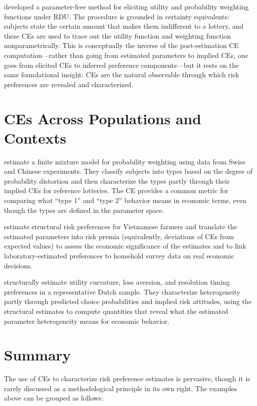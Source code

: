 \documentclass[12pt,a4paper]{article}
\begin{document}
\textcite{Abdellaoui2000} developed a parameter-free method for eliciting
utility and probability weighting functions under RDU. The procedure is
grounded in certainty equivalents: subjects state the certain amount that
makes them indifferent to a lottery, and these CEs are used to trace out the
utility function and weighting function nonparametrically. This is
conceptually the inverse of the post-estimation CE computation---rather than
going from estimated parameters to implied CEs, one goes from elicited CEs to
inferred preference components---but it rests on the same foundational
insight: CEs are the natural observable through which risk preferences are
revealed and characterized.

\section{CEs Across Populations and Contexts}

\textcite{BruhinFehrDudaEpper2010} estimate a finite mixture model for
probability weighting using data from Swiss and Chinese experiments. They
classify subjects into types based on the degree of probability distortion and
then characterize the types partly through their implied CEs for reference
lotteries. The CE provides a common metric for comparing what ``type 1'' and
``type 2'' behavior means in economic terms, even though the types are defined
in the parameter space.

\textcite{Tanaka2010} estimate structural risk preferences for Vietnamese
farmers and translate the estimated parameters into risk premia (equivalently,
deviations of CEs from expected values) to assess the economic significance of
the estimates and to link laboratory-estimated preferences to household survey
data on real economic decisions.

\textcite{vonGaudecker2011} structurally estimate utility curvature, loss
aversion, and resolution timing preferences in a representative Dutch sample.
They characterize heterogeneity partly through predicted choice probabilities
and implied risk attitudes, using the structural estimates to compute
quantities that reveal what the estimated parameter heterogeneity means for
economic behavior.

\section{Summary}

The use of CEs to characterize risk preference estimates is pervasive, though
it is rarely discussed as a methodological principle in its own right. The
examples above can be grouped as follows:
\end{document}
